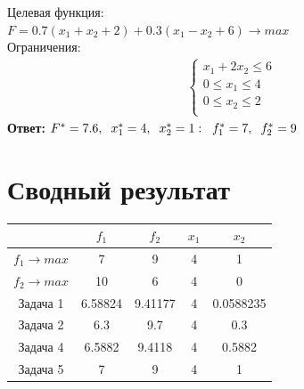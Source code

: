 \documentclass[14pt,fleqn]{extarticle}
\begin{document}
	Целевая функция:\\
	$F = 0.7(x_1 + x_2 + 2) + 0.3(x_1 - x_2 + 6) \longrightarrow max$\\
	
	Ограничения:
	\begin{align*}
		\begin{cases}
			x_1 + 2x_2 \leq 6\\
			0 \leq x_1 \leq 4\\
			0 \leq x_2 \leq 2\\
		\end{cases}
	\end{align*}
	\textbf{Ответ:} $ F^* = 7.6, \hspace{0.2cm} x_1^* = 4, \hspace{0.2cm} x_2^* = 1: \hspace{0.2cm} f_1^* = 7, \hspace{0.2cm} f_2^* = 9$
	
	\section*{Сводный результат}
	\begin{center}
			\begin{tabular}{|c|c|c|c|c|}
			\hline
			& $f_1$ & $f_2$ & $x_1$ & $x_2$\\
			\hline
			$f_1 \longrightarrow max$ & 7 & 9 & 4 & 1\\
			\hline
			$f_2 \longrightarrow max$ & 10 & 6 & 4 & 0\\
			\hline
			\small Задача 1 \normalsize & 6.58824 & 9.41177 & 4 & 0.0588235\\
			\hline
			\small Задача 2 \normalsize & 6.3 & 9.7 & 4 & 0.3\\
			\hline
			\small Задача 4 \normalsize & 6.5882 & 9.4118 & 4 & 0.5882\\
			\hline
			\small Задача 5 \normalsize & 7 & 9 & 4 & 1\\
			\hline
		\end{tabular}
	\end{center}
\end{document}
